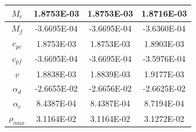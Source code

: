 \begin{table}
\begin{tabular}{||c|c|c|c||}
$M_c$        &  1.8753E-03 &  1.8753E-03 &  1.8716E-03 \\ \hline
$M_f$        & -3.6695E-04 & -3.6695E-04 & -3.6360E-04 \\ \hline
$c_{pc}$     &  1.8753E-03 &  1.8753E-03 &  1.8903E-03 \\ \hline
$c_{pf}$     & -3.6695E-04 & -3.6695E-04 & -3.5976E-04 \\ \hline
$v$          &  1.8838E-03 &  1.8839E-03 &  1.9177E-03 \\ \hline
$\alpha_d $  & -2.6655E-02 & -2.6656E-02 & -2.6625E-02 \\ \hline
$\alpha_c$   &  8.4387E-04 &  8.4387E-04 &  8.7194E-04 \\ \hline
$\rho_{max}$ &  3.1164E-02 &  3.1164E-02 &  3.1272E-02 \\ 
\hline \hline
\end{tabular}
\end{table}

